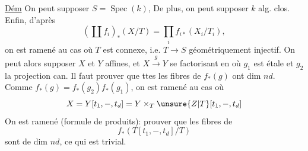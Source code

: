 \uline{Dém} On peut supposer $S=\operatorname{Spec}(k)$, De plus, on peut supposer $k$ alg. clos. Enfin, d'après
\[
(\coprod f_i)_*(X/T)=\prod_i f_{i*}(X_i/T_i),
\]
on est ramené au cas où $T$ est connexe, i.e. $T\to S$ géométriquement injectif. On peut alors supposer $X$ et $Y$ affines, et $X\xrightarrow{g}Y$  se factorisant en
où $g_1$ est étale et $g_2$ la projection can.
  Il faut prouver que ttes les fibres de $f_*(g)$ ont dim $nd$.
Comme $f_*(g)=f_*(g_2)f_*(g_1)$,  on est ramené au cas où
\[
X=Y[t_1,-,t_d]=Y\times_T\unsure{Z|T}[t_1,-,t_d]
\]
\deleted{\unsure{où} $\unsure{Z|2}=T[t$}
On est ramené (formule de produits): prouver que les fibres de
\[
f_*(T[t_1,-,t_d]/T)
\]
sont de dim $nd$, ce qui est trivial.
